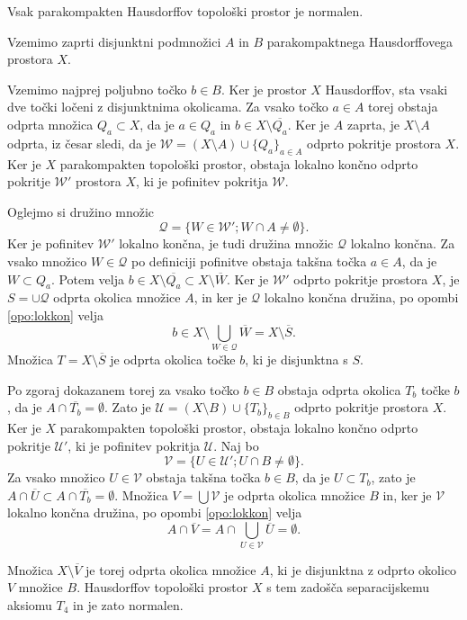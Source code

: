 \documentclass[mat1]{fmfdelo}
\newcommand{\Ucurl}{\mathcal{U}}
\newcommand{\closure}[1]{\overline{#1}}
\begin{document}
\begin{trditev}\label{trd:parkompnorm} %
Vsak parakompakten Hausdorffov topološki prostor je normalen.
\end{trditev}

\begin{dokaz}
Vzemimo zaprti disjunktni podmnožici $A$ in $B$ parakompaktnega Hausdorff\-o\-ve\-ga prostora $X$.

Vzemimo najprej poljubno točko $b \in B$. Ker je prostor $X$ Hausdorffov, sta vsaki dve točki ločeni z disjunktnima okolicama. Za vsako točko $a \in A$ torej obstaja odprta množica $Q_a \subset X$, da je $a \in Q_a$ in $b \in X \setminus \closure{Q_a}$. Ker je $A$ zaprta, je $X \setminus A$ odprta, iz česar sledi, da je $\mathcal{W} = (X \setminus A)\cup \lbrace Q_a\rbrace_{a \in A}$ odprto pokritje prostora $X$. Ker je $X$ parakompakten topološki prostor, obstaja lokalno končno odprto pokritje $\mathcal{W}'$ prostora $X$, ki je pofinitev pokritja $\mathcal{W}$.

Oglejmo si družino množic \[ \mathcal{Q} = \lbrace W \in \mathcal{W}'; W \cap A \neq \emptyset \rbrace. \]
Ker je pofinitev $\mathcal{W}'$ lokalno končna, je tudi družina množic $\mathcal{Q}$ lokalno končna.
Za vsako množico $W \in \mathcal{Q}$ po definiciji pofinitve obstaja takšna točka $a \in A$, da je $W \subset Q_a$.
 Potem velja $b \in X \setminus \closure{Q_a} \subset X \setminus \closure{W}$. Ker je $\mathcal{W}'$ odprto pokritje prostora $X$, je $S = \cup\mathcal{Q}$ odprta okolica množice $A$, in ker je $\mathcal{Q}$ lokalno končna družina, po opombi \ref{opo:lokkon} velja \[ b \in X \setminus \bigcup_{W \in \mathcal{Q}} \closure{W} = X \setminus \closure{S}. \] Množica $T = X \setminus \closure{S}$ je odprta okolica točke $b$, ki je disjunktna s $S$.

Po zgoraj dokazanem torej za vsako točko $b \in B$ obstaja odprta okolica $T_b$ točke $b$, da je $A \cap \closure{T_b} = \emptyset$. Zato je $\Ucurl = (X\setminus B) \cup \lbrace T_b \rbrace_{b \in B}$ odprto pokritje prostora $X$. Ker je $X$ parakompakten topološki prostor, obstaja lokalno končno odprto pokritje $\Ucurl'$, ki je pofinitev pokritja $\Ucurl$. Naj bo \[ \mathcal{V} = \lbrace U \in \Ucurl' ; U \cap B \neq \emptyset \rbrace. \]
Za vsako množico $U \in \mathcal{V}$ obstaja takšna točka $b \in B$, da je $U \subset T_b$, zato je $A \cap \closure{U} \subset A \cap \closure{T_b} = \emptyset$. Množica $V = \bigcup \mathcal{V}$ je odprta okolica množice $B$ in, ker je $\mathcal{V}$ lokalno končna družina, po opombi \ref{opo:lokkon} velja \[ A \cap \closure{V} = A \cap \bigcup_{U \in \mathcal{V}}\closure{U} = \emptyset.\]

Množica $X \setminus \closure{V}$ je torej odprta okolica množice $A$, ki je disjunktna z odprto okolico $V$ množice $B$. Hausdorffov topološki prostor $X$ s tem zadošča separacijskemu aksiomu $T_4$ in je zato normalen.
\end{dokaz}
\end{document}
